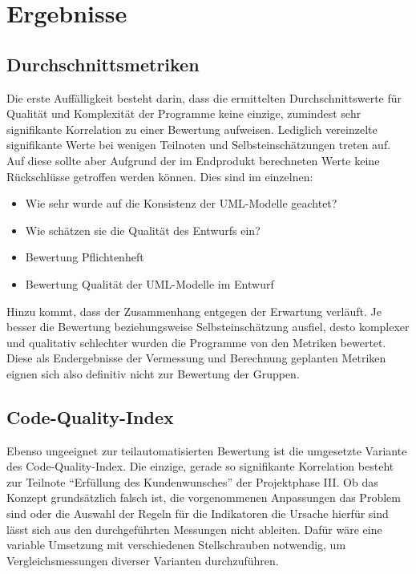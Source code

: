 \documentclass[da,ngerman]{stthesis}
\begin{document}
  		\section{Ergebnisse} \label{Analyseergebnisse}
  			\subsection{Durchschnittsmetriken}
  				Die erste Auffälligkeit besteht darin, dass die ermittelten Durchschnittswerte für Qualität und Komplexität der Programme keine einzige, zumindest sehr signifikante Korrelation zu einer Bewertung aufweisen. Lediglich vereinzelte signifikante Werte bei wenigen Teilnoten und Selbsteinschätzungen treten auf. Auf diese sollte aber Aufgrund der im Endprodukt berechneten Werte keine Rückschlüsse getroffen werden können. Dies sind im einzelnen:
  				\begin{itemize}
  					\item Wie sehr wurde auf die Konsistenz der UML-Modelle geachtet?
  					\item Wie schätzen sie die Qualität des Entwurfs ein?
  					\item Bewertung Pflichtenheft
  					\item Bewertung Qualität der UML-Modelle im Entwurf 
				\end{itemize}  
				Hinzu kommt, dass der Zusammenhang entgegen der Erwartung verläuft. Je besser die Bewertung beziehungsweise Selbsteinschätzung ausfiel, desto komplexer und qualitativ schlechter wurden die Programme von den Metriken bewertet.	\newline
				Diese als Endergebnisse der Vermessung und Berechnung geplanten Metriken eignen sich also definitiv nicht zur Bewertung der Gruppen.			  
  			\subsection{Code-Quality-Index}
  				Ebenso ungeeignet zur teilautomatisierten Bewertung ist die umgesetzte Variante des Code-Quality-Index. Die einzige, gerade so signifikante Korrelation besteht zur Teilnote "`Erfüllung des Kundenwunsches"' der Projektphase III. Ob das Konzept grundsätzlich falsch ist, die vorgenommenen Anpassungen das Problem sind oder die Auswahl der Regeln für die Indikatoren die Ursache hierfür sind lässt sich aus den durchgeführten Messungen nicht ableiten. Dafür wäre eine variable Umsetzung mit verschiedenen Stellschrauben notwendig, um Vergleichsmessungen diverser Varianten durchzuführen.
\end{document}
